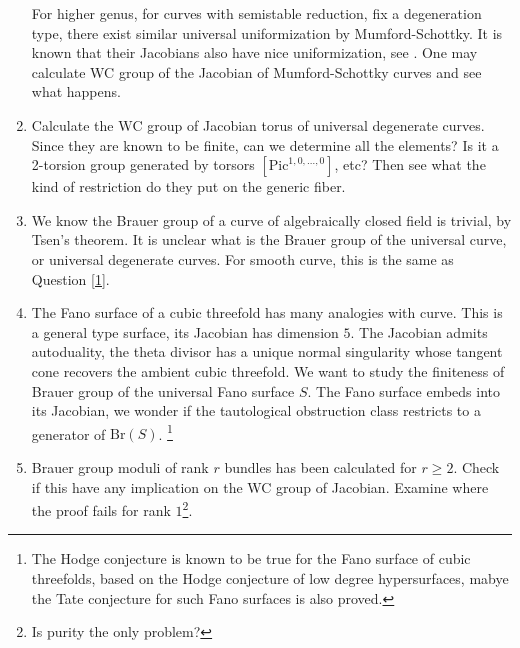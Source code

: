 \documentclass[8pt]{amsart}
\begin{document}
\begin{enumerate}
    For higher genus, for curves with semistable reduction, fix a degeneration type, there exist similar universal uniformization by Mumford-Schottky. It is known that their Jacobians also have nice uniformization, see \cite[VI]{Scho}. One may calculate WC group of the Jacobian of Mumford-Schottky curves and see what happens.
\item Calculate the $\mathrm{WC}$ group of Jacobian torus of universal degenerate curves. Since they are known to be finite, can we determine all the elements? Is it a 2-torsion group generated by torsors $[\mathrm{Pic}^{1,0,\dots,0}]$, etc? Then see what the kind of restriction do they put on the generic fiber.
\item We know the Brauer group of a curve of algebraically closed field is trivial, by Tsen's theorem. It is unclear what is the Brauer group of the universal curve, or universal degenerate curves. For smooth curve, this is the same as Question \ref{1}.
\item The Fano surface of a cubic threefold has many analogies with curve. This is a general type surface, its Jacobian has dimension $5$. The Jacobian admits autoduality, the theta divisor has a unique normal singularity whose tangent cone recovers the ambient cubic threefold. We want to study the finiteness of Brauer group of the universal Fano surface $S$. The Fano surface embeds into its Jacobian, we wonder if the tautological obstruction class restricts to a generator of $\mathrm{Br}(S)$. \footnote{The Hodge conjecture is known to be true for the Fano surface of cubic threefolds, based on the Hodge conjecture of low degree hypersurfaces, mabye the Tate conjecture for such Fano surfaces is also proved.}
\item Brauer group moduli of rank $r$ bundles has been calculated for $r\geq2$. Check if this have any implication on the WC group of Jacobian. Examine where the proof fails for rank $1$\footnote{Is purity the only problem?}.
\end{enumerate}
\end{document}
